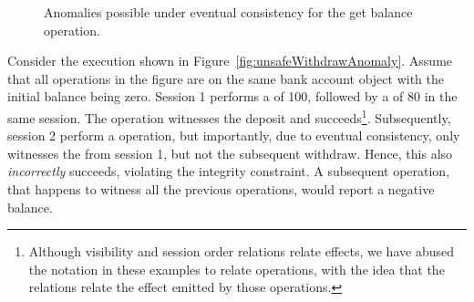 \begin{figure}[ht]
\centering
{}
\hfill
{}
\hfill
{}
\caption{Anomalies possible under eventual consistency for the get balance operation.}
\label{fig:ba_anomalies}
\end{figure}

Consider the execution shown in Figure~\ref{fig:unsafeWithdrawAnomaly}. Assume
that all operations in the figure are on the same bank account object with the
initial balance being zero. Session 1 performs a  of 100, followed
by a  of 80 in the same session. The  operation
witnesses the deposit and succeeds\footnote{Although visibility and session
order relations relate effects, we have abused the notation in these examples
to relate operations, with the idea that the relations relate the effect
emitted by those operations.}. Subsequently, session 2 perform a 
operation, but importantly, due to eventual consistency, only witnesses the
 from session 1, but not the subsequent withdraw. Hence, this
 also \emph{incorrectly} succeeds, violating the integrity
constraint. A subsequent  operation, that happens to witness all
the previous operations, would report a negative balance.


